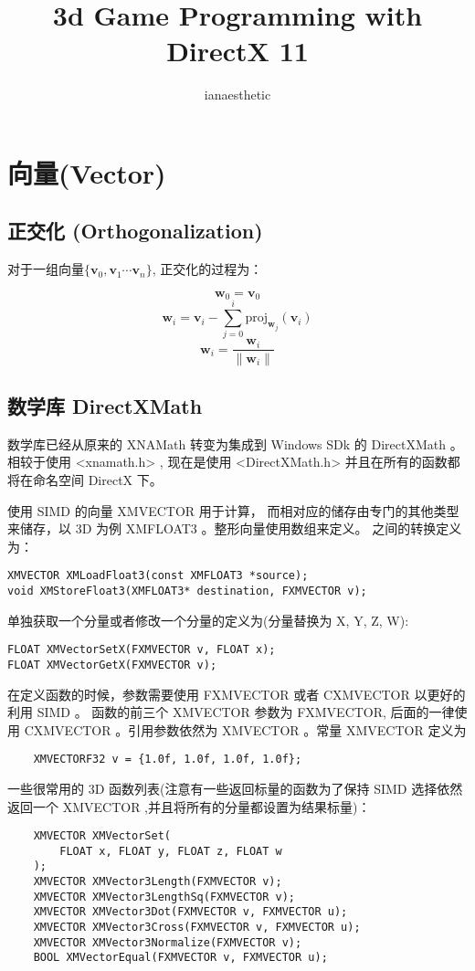 \documentclass[10pt, a4paper]{article}
\author{ianaesthetic}
\title{3d Game Programming with DirectX 11}
\begin{document}
\maketitle
\newpage

\section{向量(Vector)}
    \subsection{正交化 (Orthogonalization)}
        对于一组向量$\{ \textbf{v}_0, \textbf{v}_1 \cdots \textbf{v}_n \}$, 正交化的过程为：

        $$\textbf{w}_0 = \textbf{v}_0$$
        $$\textbf{w}_i = \textbf{v}_i - \sum_{j = 0}^{i}\text{proj}_{\textbf{w}_j}(\textbf{v}_i)$$
        $$\textbf{w}_i = \frac{\textbf{w}_i}{\parallel \textbf{w}_i \parallel}$$

    \subsection{数学库 DirectXMath}
        数学库已经从原来的 XNAMath 转变为集成到 Windows SDk 的 DirectXMath 。 相较于使用 <xnamath.h> , 现在是使用 <DirectXMath.h> 并且在所有的函数都将在命名空间 DirectX 下。
        
        使用 SIMD 的向量 XMVECTOR 用于计算， 而相对应的储存由专门的其他类型来储存，以 3D 为例 XMFLOAT3 。整形向量使用数组来定义。 之间的转换定义为： 
\begin{lstlisting}  
XMVECTOR XMLoadFloat3(const XMFLOAT3 *source);
void XMStoreFloat3(XMFLOAT3* destination, FXMVECTOR v); 
\end{lstlisting}
        
        单独获取一个分量或者修改一个分量的定义为(分量替换为 X, Y, Z, W):
\begin{lstlisting}
FLOAT XMVectorSetX(FXMVECTOR v, FLOAT x); 
FLOAT XMVectorGetX(FXMVECTOR v); 
\end{lstlisting}

        在定义函数的时候，参数需要使用 FXMVECTOR 或者 CXMVECTOR 以更好的利用 SIMD 。 函数的前三个 XMVECTOR 参数为 FXMVECTOR, 后面的一律使用 CXMVECTOR 。引用参数依然为 XMVECTOR 。常量 XMVECTOR 定义为 
\begin{lstlisting}
    XMVECTORF32 v = {1.0f, 1.0f, 1.0f, 1.0f}; 
\end{lstlisting}
    
    \medskip

        一些很常用的 3D 函数列表(注意有一些返回标量的函数为了保持 SIMD 选择依然返回一个 XMVECTOR ,并且将所有的分量都设置为结果标量)：

\begin{lstlisting}
    XMVECTOR XMVectorSet(
        FLOAT x, FLOAT y, FLOAT z, FLOAT w
    );
    XMVECTOR XMVector3Length(FXMVECTOR v); 
    XMVECTOR XMVector3LengthSq(FXMVECTOR v); 
    XMVECTOR XMVector3Dot(FXMVECTOR v, FXMVECTOR u); 
    XMVECTOR XMVector3Cross(FXMVECTOR v, FXMVECTOR u);
    XMVECTOR XMVector3Normalize(FXMVECTOR v);
    BOOL XMVectorEqual(FXMVECTOR v, FXMVECTOR u);
\end{lstlisting}
\end{document}
